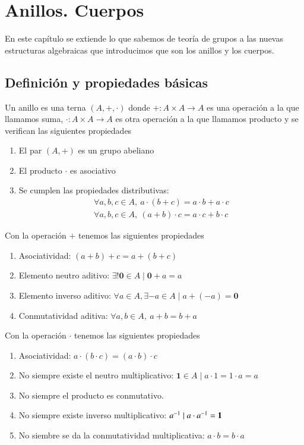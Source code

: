 
\chapter{Anillos. Cuerpos}

\newcommand{\0}{\mathbf{0}}
\newcommand{\1}{\mathbf{1}}

En este capítulo se extiende lo que sabemos de teoría de grupos a las nuevas estructuras algebraicas que introducimos que son los anillos y los cuerpos.

\section{Definición y propiedades básicas}

\begin{dfn}[Anillo]
	Un anillo es una terna $(A, +, \cdot)$ donde $+: A \times A \to A$ es una operación a la que llamamos suma, $\cdot: A \times A \to A$ es otra operación a la que llamamos producto y se verifican las siguientes propiedades
	\begin{enumerate}
		\item El par $(A, +)$ es un grupo abeliano
		\item El producto $\cdot$ es asociativo
		\item Se cumplen las propiedades distributivas:
		\begin{align}
			\forall a, b , c \in A,\ a\cdot (b + c) = a\cdot b + a \cdot c \\
			\forall a, b , c \in A,\ (a + b) \cdot c = a\cdot c + b \cdot c
		\end{align}
	\end{enumerate}
\end{dfn}

Con la operación $+$ tenemos las siguientes propiedades
\begin{enumerate}
	\item Asociatividad: $(a+b)+c = a+(b+c)$
	\item Elemento neutro aditivo: $\exists! \0 \in A \mid \0+a = a$
	\item Elemento inverso aditivo: $\forall a \in A, \exists -a \in A \mid a + (-a) = \0$
	\item Conmutatividad aditiva: $\forall a, b \in A,\ a+b = b+a$
\end{enumerate}

Con la operación $\cdot$ tenemos las siguientes propiedades
\begin{enumerate}
	\item Asociatividad: $a\cdot (b \cdot c) = (a \cdot b) \cdot c$
	\item No siempre existe el neutro multiplicativo: $\1 \in A \mid a\cdot 1 = 1 \cdot a = a$
	\item No siempre el producto es conmutativo.
	\item No siempre existe inverso multiplicativo: $\inv{a} \mid a\cdot \inv{a} = \1$
	\item No siembre se da la conmutatividad multiplicativa: $a \cdot b = b\cdot a$
\end{enumerate}

